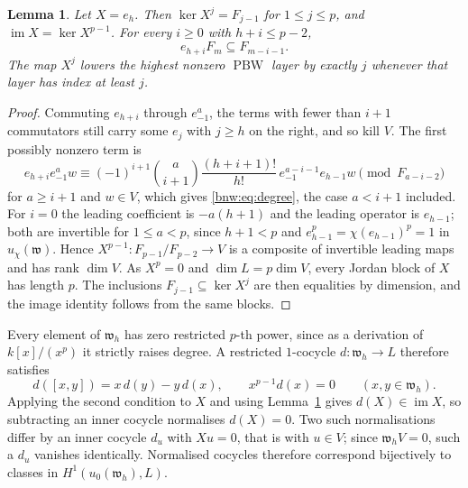 \documentclass[11pt,reqno]{amsart}
\newtheorem{lemma}[lemma]{Lemma}
\theoremstyle{definition}
\theoremstyle{remark}
\theoremstyle{definition}
\begin{document}
\begin{lemma}\label{bnw:lem:pivot}
Let $X=e_h$. Then $\ker X^j=F_{j-1}$ for $1\le j\le p$, and
$\operatorname{im}X=\ker X^{p-1}$. For every $i\ge0$ with
$h+i\le p-2$,
\begin{equation}\label{bnw:eq:degree}
e_{h+i}F_m\subseteq F_{m-i-1}.
\end{equation}
The map $X^j$ lowers the highest nonzero $\operatorname{PBW}$ layer by
exactly $j$ whenever that layer has index at least $j$.
\end{lemma}

\begin{proof}
Commuting $e_{h+i}$ through $e_{-1}^a$, the terms with fewer than
$i+1$ commutators still carry some $e_j$ with $j\ge h$ on the right,
and so kill $V$. The first possibly nonzero term is
\begin{equation}\label{bnw:eq:leading}
e_{h+i}e_{-1}^aw\equiv(-1)^{i+1}\binom{a}{i+1}
\frac{(h+i+1)!}{h!}\,e_{-1}^{a-i-1}e_{h-1}w
\pmod{F_{a-i-2}}
\end{equation}
for $a\ge i+1$ and $w\in V$, which gives \eqref{bnw:eq:degree}, the case
$a<i+1$ included. For $i=0$ the leading coefficient is $-a(h+1)$ and
the leading operator is $e_{h-1}$; both are invertible for
$1\le a<p$, since $h+1<p$ and $e_{h-1}^p=\chi(e_{h-1})^p=1$ in
$u_\chi(\mathfrak{w})$. Hence $X^{p-1}:F_{p-1}/F_{p-2}\to V$ is a composite of
invertible leading maps and has rank $\dim V$. As $X^p=0$ and
$\dim L=p\dim V$, every Jordan block of $X$ has length $p$. The
inclusions $F_{j-1}\subseteq\ker X^j$ are then equalities by dimension,
and the image identity follows from the same blocks.
\end{proof}

Every element of $\mathfrak{w}_h$ has zero restricted $p$-th power, since as a
derivation of $k[x]/(x^p)$ it strictly raises degree. A restricted
$1$-cocycle $d:\mathfrak{w}_h\to L$ therefore satisfies
\begin{equation}\label{bnw:eq:restricted}
d([x,y])=x\,d(y)-y\,d(x),\qquad x^{p-1}d(x)=0\qquad(x,y\in\mathfrak{w}_h).
\end{equation}
Applying the second condition to $X$ and using Lemma~\ref{bnw:lem:pivot}
gives $d(X)\in\operatorname{im}X$, so subtracting an inner cocycle
normalises $d(X)=0$. Two such normalisations differ by an inner cocycle $d_u$ with
$Xu=0$, that is with $u\in V$; since $\mathfrak{w}_hV=0$, such a $d_u$ vanishes
identically. Normalised cocycles therefore correspond bijectively to
classes in $H^1(u_0(\mathfrak{w}_h),L)$.
\end{document}
